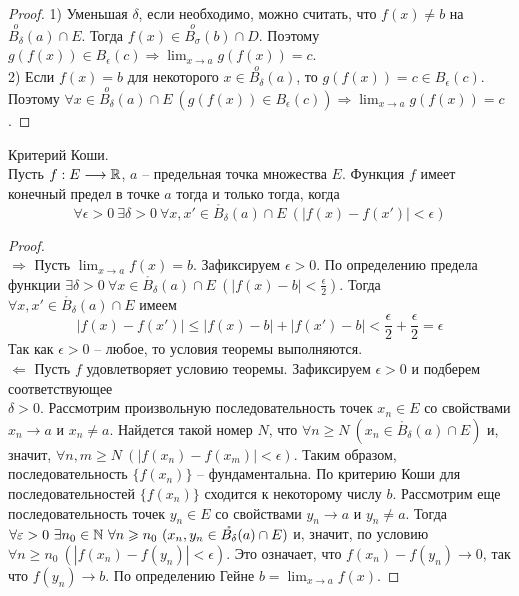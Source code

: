 \begin{enumerate}
\begin{proof}
            1) Уменьшая $\delta$, если необходимо, можно считать, что $f(x) \neq b$ на $\overset{o}{B_{\delta}}(a) \cap E$. Тогда $f(x) \in \overset{o}{B_{\sigma}}(b) \cap D$. Поэтому $g(f(x)) \in \overset{}{B_{\epsilon}}(c) \Rightarrow \lim_{x \rightarrow a} g(f(x)) = c$.
            \\
            2) Если $f(x) = b$ для некоторого $x \in \overset{o}{B_{\delta}}(a)$, то $g(f(x)) = c \in \overset{}{B_{\epsilon}}(c)$. Поэтому $\forall x \in \overset{o}{B_{\delta}}(a) \cap E \ (g(f(x)) \in \overset{}{B_{\epsilon}}(c)) \Rightarrow \lim_{x \rightarrow a} g(f(x)) = c$.
        \end{proof}
    \end{enumerate}

    \begin{theorem} Критерий Коши.\\
        Пусть $f : E \longrightarrow \mathbb{R}$, $a$ -- предельная точка множества $E$. Функция $f$ имеет конечный предел в точке $a$ тогда и только тогда, когда 
        \[\forall \epsilon > 0 \ \exists \delta > 0 \ \forall x, x' \in \mathring{B_{\delta}}(a) \cap E \ (|f(x) - f(x')| < \epsilon)\]
    \end{theorem}
    
    \begin{proof} \ \\
        $\Rightarrow$ Пусть $\lim_{x \to a} f(x) = b$. Зафиксируем $\epsilon > 0$. По определению предела функции $\exists \delta > 0 \ \forall x \in \mathring{B_{\delta}}(a) \cap E \ (|f(x) - b| < \frac{\epsilon}{2})$. Тогда $\forall x, x' \in \mathring{B_{\delta}}(a) \cap E$ имеем
        \[|f(x) - f(x')| \leq |f(x) - b| + |f(x') - b| < \frac{\epsilon}{2} + \frac{\epsilon}{2} = \epsilon\]
        Так как $\epsilon > 0$ -- любое, то условия теоремы выполняются.
        \\
        $\Leftarrow$ Пусть $f$ удовлетворяет условию теоремы. Зафиксируем $\epsilon > 0$ и подберем соответствующее \\ $\delta > 0$. Рассмотрим произвольную последовательность точек $x_{n} \in E$ со свойствами $x_{n} \to a$ и $x_{n} \neq a$. Найдется такой номер $N$, что $\forall n \geq N \ (x_{n} \in \mathring{B_{\delta}}(a) \cap E)$ и, значит, $\forall n, m \geq N \ (|f(x_{n}) - f(x_{m})| < \epsilon)$. Таким образом, последовательность $\{f(x_{n})\}$ -- фундаментальна. По критерию Коши для последовательностей $\{f(x_{n})\}$ сходится к некоторому числу $b$. Рассмотрим еще последовательность точек $y_{n} \in E$ со свойствами $y_{n} \to a$ и $y_{n} \neq a$. Тогда $\forall \varepsilon > 0 \ \exists n_{0} \in \mathbb{N} \ \forall n \geqslant n_{0} \ (x_{n}, y_{n} \in \mathring{B_{\delta}}(a) \cap E)$ и, значит, по условию $\forall n \geq n_{0} \ (|f(x_{n}) - f(y_{n})| < \epsilon)$. Это означает, что $f(x_{n}) - f(y_{n}) \to 0$, так что $f(y_{n}) \to b$. По определению Гейне $b = \lim_{x \to a} f(x)$.
    \end{proof}

